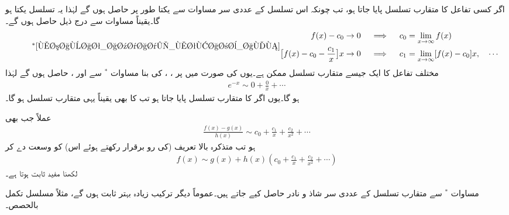 اگر کسی تفاعل کا متقارب تسلسل پایا جاتا ہو، تب چونکہ اس تسلسل کے عددی سر  مساوات  سے یکتا طور پر حاصل ہوں گے لہٰذا  یہ تسلسل یکتا ہو گا۔یقیناً مساوات   سے درج ذیل حاصل ہوں گے۔
\begin{equation*}\tag*{${}^{\ast}$\ref{مساوات_اعدادی_متقارب_الف}}
\begin{aligned}
f(x)-c_0 &\to 0 \quad \implies \quad c_0=\lim_{x\to\infty} f(x)\\
\big[f(x)-c_0-\frac{c_1}{x}\big]x&\to 0\quad \implies \quad c_1=\lim_{x\to \infty} [f(x)-c_0]x, \quad \cdots
\end{aligned}
\end{equation*}
مختلف تفاعل کا ایک جیسے متقارب تسلسل ممکن ہے۔یوں   کی صورت میں  پر ، ،   کی بنا  مساوات $^*$ سے  اور ،   حاصل ہوں گے لہٰذا
\begin{align*}
e^{-x} \sim 0+\frac{0}{x}+\cdots
\end{align*}
ہو گا۔یوں اگر  کا متقارب تسلسل پایا جاتا ہو تب  کا بھی یقیناً یہی متقارب تسلسل ہو گا۔

عملاً جب بھی
\begin{align*}
\frac{f(x)-g(x)}{h(x)}\sim  c_0+\frac{c_1}{x}+\frac{c_2}{x^2}+\cdots
\end{align*}
ہو تب متذکرہ بالا تعریف (کی رو برقرار رکھتے ہوئے اس) کو وسعت دے کر 
\begin{align*}
f(x)\sim g(x)+h(x)(c_0+\frac{c_1}{x}+\frac{c_2}{x^2}+\cdots)
\end{align*}
لکھنا مفید ثابت ہوتا ہے۔

مساوات $^*$ سے متقارب تسلسل کے عددی سر شاذ و نادر حاصل کیے جاتے ہیں۔عموماً دیگر ترکیب زیادہ بہتر ثابت ہوں گے، مثلاً مسلسل تکمل بالحصص۔

